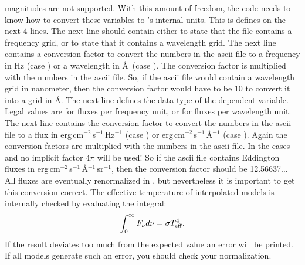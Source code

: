 magnitudes are not supported. With this amount of freedom, the code needs to
know how to convert these variables to \Cloudy's internal units. This is
defines on the next 4 lines. The next line should contain either
 to state that the file contains a frequency grid, or
 to state that it contains a wavelength grid. The next line
contains a conversion factor to convert the numbers in the ascii file to a
frequency in Hz (case ) or a wavelength in \AA\ (case
). The conversion factor is multiplied with the numbers in
the ascii file. So, if the ascii file would contain a wavelength grid in
nanometer, then the conversion factor would have to be 10 to convert it into a
grid in \AA. The next line defines the data type of the dependent variable.
Legal values are  for fluxes per frequency unit, or
 for fluxes per wavelength unit. The next
line contains the conversion factor to convert the numbers in the ascii file
to a flux in erg\,cm$^{-2}$\,s$^{-1}$\,Hz$^{-1}$ (case ) or erg\,cm$^{-2}$\,s$^{-1}$\,\AA$^{-1}$ (case ). Again the conversion factors are multiplied with the numbers in
the ascii file. In the cases  and  no
implicit factor $4\pi$ will be used! So if the ascii file contains Eddington
fluxes  in erg\,cm$^{-2}$\,s$^{-1}$\,\AA$^{-1}$\,sr$^{-1}$,
then the conversion factor should be 12.56637$\ldots$ All fluxes are
eventually renormalized in \Cloudy, but nevertheless it is important to get
this conversion correct. The effective temperature of interpolated models is
internally checked by evaluating the integral:
\[ \int_0^\infty F_\nu d \nu = \sigma T_{\rm eff}^4. \]
If the result deviates too much from the expected value an error will be
printed. If all models generate such an error, you should check your
normalization.

